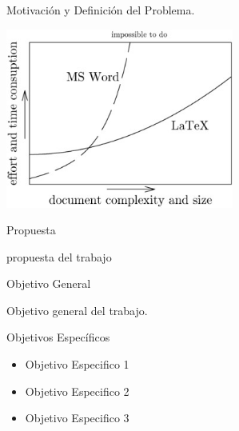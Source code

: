 \begin{frame}[t]{Motivación y Definición del Problema.}
  \begin{center}
    \includegraphics[width=7.5cm]{../book/capitulo-ej/graphics/ejemplo-1.jpg}
  \end{center}
\end{frame}



\begin{frame}[c]{Propuesta}
    \begin{center}
    propuesta del trabajo
    \end{center}
\end{frame}


\begin{frame}[c]{Objetivo General}
    \begin{center}
    Objetivo general del trabajo.
    \end{center}
\end{frame}


\begin{frame}[t]{Objetivos Específicos}
    \begin{center}
        \begin{itemize}
        \item Objetivo Especifico 1
        \item Objetivo Especifico 2
        \item Objetivo Especifico 3
        \end{itemize}
    \end{center}
\end{frame}


